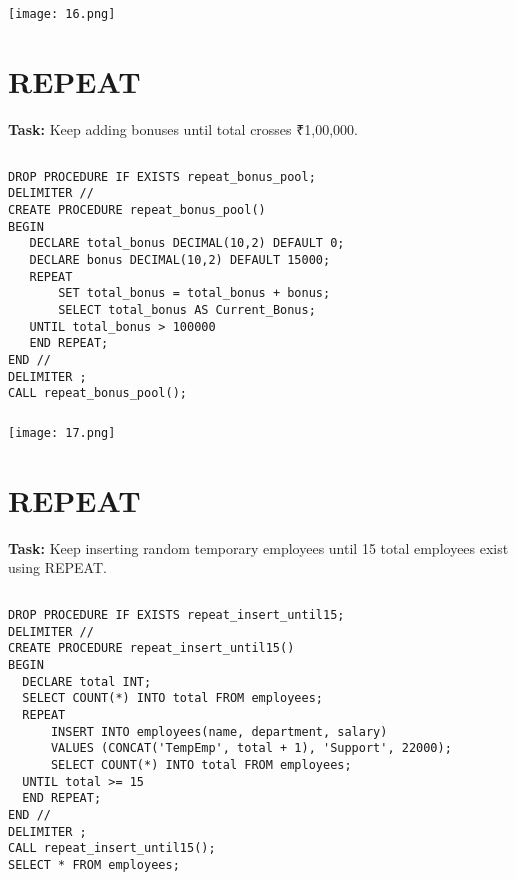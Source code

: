 \documentclass[12pt,a4paper]{article}
\begin{document}
\subsubsection{}
\begin{center}
    \texttt{[image: 16.png]}
\end{center}


\section{REPEAT}
\textbf{Task:} Keep adding bonuses until total crosses ₹1,00,000.

\subsection{}
\begin{lstlisting}
DROP PROCEDURE IF EXISTS repeat_bonus_pool;
DELIMITER //
CREATE PROCEDURE repeat_bonus_pool()
BEGIN
   DECLARE total_bonus DECIMAL(10,2) DEFAULT 0;
   DECLARE bonus DECIMAL(10,2) DEFAULT 15000;
   REPEAT
       SET total_bonus = total_bonus + bonus;
       SELECT total_bonus AS Current_Bonus;
   UNTIL total_bonus > 100000
   END REPEAT;
END //
DELIMITER ;
CALL repeat_bonus_pool();

\end{lstlisting}

\subsubsection{}
\begin{center}
    \texttt{[image: 17.png]}
\end{center}


\section{REPEAT}
\textbf{Task:} Keep inserting random temporary employees until 15 total employees exist
using REPEAT.

\subsection{}
\begin{lstlisting}
DROP PROCEDURE IF EXISTS repeat_insert_until15;
DELIMITER //
CREATE PROCEDURE repeat_insert_until15()
BEGIN
  DECLARE total INT;
  SELECT COUNT(*) INTO total FROM employees;
  REPEAT
      INSERT INTO employees(name, department, salary)
      VALUES (CONCAT('TempEmp', total + 1), 'Support', 22000);
      SELECT COUNT(*) INTO total FROM employees;
  UNTIL total >= 15
  END REPEAT;
END //
DELIMITER ;
CALL repeat_insert_until15();
SELECT * FROM employees;

\end{lstlisting}
\end{document}
